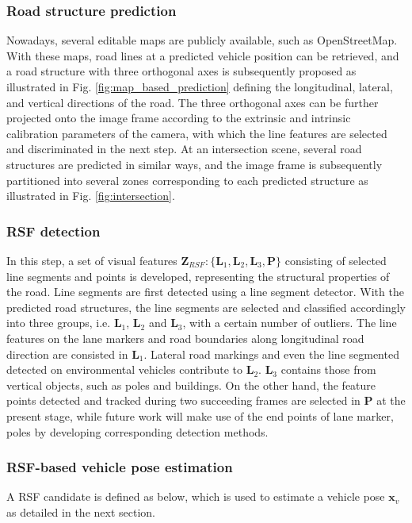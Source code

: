 \documentclass[letterpaper, 10 pt, conference]{ieeeconf}  %
\begin{document}
\subsubsection{Road structure prediction}
Nowadays, several editable maps are publicly available, such as OpenStreetMap. With these maps, road lines at a predicted vehicle position can be retrieved, and a road structure with three orthogonal axes is subsequently proposed as illustrated in Fig. \ref{fig:map_based_prediction} defining the longitudinal, lateral, and vertical directions of the road. The three orthogonal axes can be further projected onto the image frame according to the extrinsic and intrinsic calibration parameters of the camera, with which the line features are selected and discriminated in the next step. At an intersection scene, several road structures are predicted in similar ways, and the image frame is subsequently partitioned into several zones corresponding to each predicted structure as illustrated in Fig. \ref{fig:intersection}.

\subsubsection{RSF detection}
In this step, a set of visual features $\mathbf{Z}_{RSF}:\{\mathbf{L}_1,\mathbf{L}_2,\mathbf{L}_3,\mathbf{P}\}$ consisting of selected line segments and points is developed, representing the  structural properties of the road. Line segments are first detected using a line segment detector\cite{von2012lsd}. With the predicted road structures, the line segments are selected and classified accordingly into three groups, i.e. $\mathbf{L}_1$, $\mathbf{L}_2$ and $\mathbf{L}_3$, with a certain number of outliers. The line features on the lane markers and road boundaries along longitudinal road direction are consisted in $\mathbf{L}_1$. Lateral road markings and even the line segmented detected on environmental vehicles contribute to $\mathbf{L}_2$. $\mathbf{L}_3$ contains those from vertical objects, such as poles and buildings. On the other hand, the feature points detected and tracked during two succeeding frames are selected in $\mathbf{P}$ at the present stage, while future work will make use of the end points of lane marker, poles by developing corresponding detection methods.

\subsubsection{RSF-based vehicle pose estimation}
A RSF candidate is defined as below, which is used to estimate a vehicle pose $\mathbf{x}_v$ as detailed in the next section.
\end{document}
